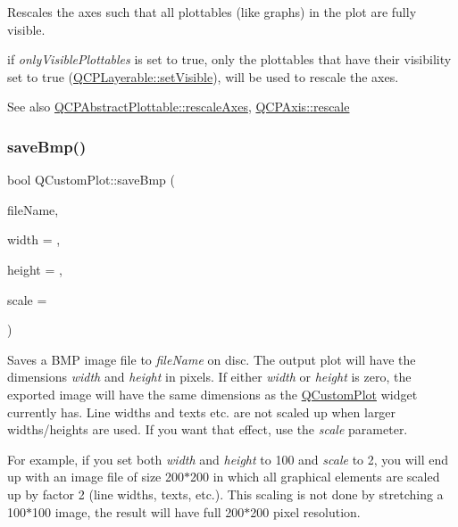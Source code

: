 Rescales the axes such that all plottables (like graphs) in the plot are fully visible.

if {\itshape only\+Visible\+Plottables} is set to true, only the plottables that have their visibility set to true (\hyperlink{class_q_c_p_layerable_a3bed99ddc396b48ce3ebfdc0418744f8}{Q\+C\+P\+Layerable\+::set\+Visible}), will be used to rescale the axes.

\begin{DoxySeeAlso}{See also}
\hyperlink{class_q_c_p_abstract_plottable_a1491c4a606bccd2d09e65e11b79eb882}{Q\+C\+P\+Abstract\+Plottable\+::rescale\+Axes}, \hyperlink{class_q_c_p_axis_a499345f02ebce4b23d8ccec96e58daa9}{Q\+C\+P\+Axis\+::rescale} 
\end{DoxySeeAlso}
\hypertarget{class_q_custom_plot_a6629d9e8e6da4bf18055ee0257fdce9a}{}\label{class_q_custom_plot_a6629d9e8e6da4bf18055ee0257fdce9a} 
\subsubsection{\texorpdfstring{save\+Bmp()}{saveBmp()}}
{\footnotesize\ttfamily bool Q\+Custom\+Plot\+::save\+Bmp (\begin{DoxyParamCaption}\item[{const Q\+String \&}]{file\+Name,  }\item[{int}]{width = {},  }\item[{int}]{height = {},  }\item[{double}]{scale = {} }\end{DoxyParamCaption})}

Saves a B\+MP image file to {\itshape file\+Name} on disc. The output plot will have the dimensions {\itshape width} and {\itshape height} in pixels. If either {\itshape width} or {\itshape height} is zero, the exported image will have the same dimensions as the \hyperlink{class_q_custom_plot}{Q\+Custom\+Plot} widget currently has. Line widths and texts etc. are not scaled up when larger widths/heights are used. If you want that effect, use the {\itshape scale} parameter.

For example, if you set both {\itshape width} and {\itshape height} to 100 and {\itshape scale} to 2, you will end up with an image file of size 200$\ast$200 in which all graphical elements are scaled up by factor 2 (line widths, texts, etc.). This scaling is not done by stretching a 100$\ast$100 image, the result will have full 200$\ast$200 pixel resolution.

